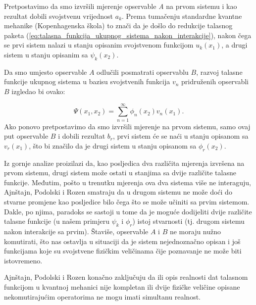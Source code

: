 Pretpostavimo da smo izvršili mjerenje opservable {\it{A}} na prvom sistemu i kao rezultat dobili svojstvenu vrijednost $a_k$.
Prema tumačenju standardne kvantne mehanike (Kopenhagenska škola) to znači da je došlo do redukcije talasnog paketa (\ref{eq:talasna_funkcija_ukupnog_sistema_nakon_interakcije}), nakon čega se prvi sistem nalazi u stanju opisanim svojstvenom funkcijom $u_k(x_1)$, a drugi sistem u stanju opisanim sa $\psi_k(x_2)$.

Da smo umjesto opservable $A$ odlučili posmatrati opservablu $B$, razvoj talasne funkcije ukupnog sistema u bazisu svojstvenih funkcija $v_n$ pridruženih opservabli $B$ izgledao bi ovako:

\begin{equation}
    \Psi(x_1, x_2) = \sum_{n=1}^{\infty} \phi_n(x_2)v_n(x_1).
\end{equation}
Ako ponovo pretpostavimo da smo izvršili mjerenje na prvom sistemu, samo ovaj put opservable $B$ i dobili rezultat $b_r$, prvi sistem će se naći u stanju opisanom sa $v_r(x_1)$, što bi značilo da je drugi sistem u stanju opisanom sa $\phi_r(x_2)$.

Iz gornje analize proizilazi da, kao posljedica dva različita mjerenja izvršena na prvom sistemu,
drugi sistem može ostati u stanjima sa dvije različite talasne funkcije.
Međutim, pošto u trenutku mjerenja ova dva sistema više ne interaguju, Ajnštajn, Podolski i Rozen smatraju da u drugom sistemu ne može doći do stvarne promjene kao posljedice
bilo čega što se može učiniti sa prvim sistemom.
Dakle, po njima, paradoks se sastoji u tome da je moguće dodijeliti dvije različite talasne funkcije (u našem primjeru $\psi_k$ i $\phi_r$) istoj stvarnosti (tj. drugom sistemu nakon interakcije sa prvim).
Štaviše, opservable $A$ i $B$ ne moraju nužno komutirati, što nas ostavlja u situaciji da je sistem nejednoznačno opisan i još funkcijama koje su svojstvene fizičkim veličinama čije poznavanje ne može biti istovremeno.


Ajnštajn, Podolski i Rozen konačno zaključuju da ili opis realnosti dat talasnom funkcijom u kvantnoj mehanici nije kompletan
ili dvije fizičke veličine opisane nekomutirajućim operatorima ne mogu imati simultanu realnost.

